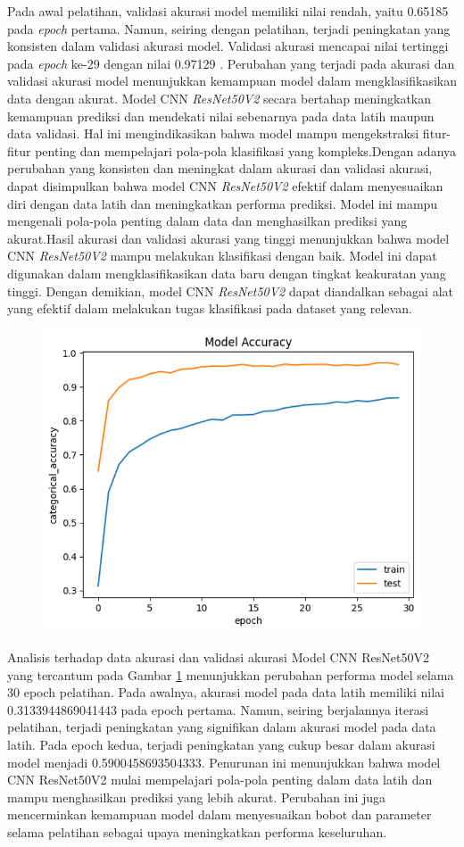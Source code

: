 Pada awal pelatihan, validasi akurasi model memiliki nilai rendah, yaitu 0.65185 pada \textit{epoch} pertama. Namun, seiring dengan pelatihan, terjadi peningkatan yang konsisten dalam validasi akurasi model. Validasi akurasi mencapai nilai tertinggi pada \textit{epoch} ke-29 dengan nilai 0.97129 . Perubahan yang terjadi pada akurasi dan validasi akurasi model menunjukkan kemampuan model dalam mengklasifikasikan data dengan akurat. Model CNN \textit{ResNet50V2} secara bertahap meningkatkan kemampuan prediksi dan mendekati nilai sebenarnya pada data latih maupun data validasi. Hal ini mengindikasikan bahwa model mampu mengekstraksi fitur-fitur penting dan mempelajari pola-pola klasifikasi yang kompleks.Dengan adanya perubahan yang konsisten dan meningkat dalam akurasi dan validasi akurasi, dapat disimpulkan bahwa model CNN \textit{ResNet50V2} efektif dalam menyesuaikan diri dengan data latih dan meningkatkan performa prediksi. Model ini mampu mengenali pola-pola penting dalam data dan menghasilkan prediksi yang akurat.Hasil akurasi dan validasi akurasi yang tinggi menunjukkan bahwa model CNN \textit{ResNet50V2} mampu melakukan klasifikasi dengan baik. Model ini dapat digunakan dalam mengklasifikasikan data baru dengan tingkat keakuratan yang tinggi. Dengan demikian, model CNN \textit{ResNet50V2} dapat diandalkan sebagai alat yang efektif dalam melakukan tugas klasifikasi pada dataset yang relevan.

\begin{figure}[!hbt]
	\centering
	\includegraphics[width=0.7\linewidth]{gambar/bener/Accuracy_ModelResNet50V2.png}
	\label{fig:AkurasiCNNResNet50V2}
\end{figure}

Analisis terhadap data akurasi dan validasi akurasi Model CNN ResNet50V2 yang tercantum pada Gambar \ref{fig:AkurasiCNNResNet50V2} menunjukkan perubahan performa model selama 30 epoch pelatihan. Pada awalnya, akurasi model pada data latih memiliki nilai 0.3133944869041443 pada epoch pertama. Namun, seiring berjalannya iterasi pelatihan, terjadi peningkatan yang signifikan dalam akurasi model pada data latih. Pada epoch kedua, terjadi peningkatan yang cukup besar dalam akurasi model menjadi 0.5900458693504333. Penurunan ini menunjukkan bahwa model CNN ResNet50V2 mulai mempelajari pola-pola penting dalam data latih dan mampu menghasilkan prediksi yang lebih akurat. Perubahan ini juga mencerminkan kemampuan model dalam menyesuaikan bobot dan parameter selama pelatihan sebagai upaya meningkatkan performa keseluruhan.

